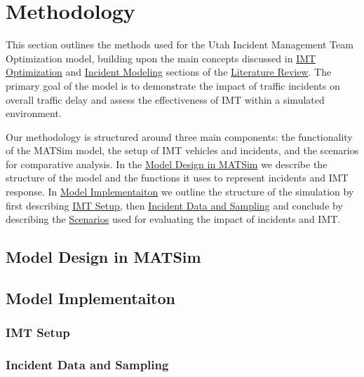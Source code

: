 \documentclass[fancy, oneside, mastersfancy, ms]{byuthesis}
\begin{document}

\hypertarget{sec-methods}{%
\chapter{Methodology}\label{sec-methods}}

This section outlines the methods used for the Utah Incident Management
Team Optimization model, building upon the main concepts discussed in
\protect\hyperlink{sec-lit_imt_opt}{IMT Optimization} and
\protect\hyperlink{sec-lit_inc_mod}{Incident Modeling} sections of the
\protect\hyperlink{sec-literature}{Literature Review}. The primary goal
of the model is to demonstrate the impact of traffic incidents on
overall traffic delay and assess the effectiveness of IMT within a
simulated environment.

Our methodology is structured around three main components: the
functionality of the MATSim model, the setup of IMT vehicles and
incidents, and the scenarios for comparative analysis. In the
\protect\hyperlink{sec-MATSim_mod}{Model Design in MATSim} we describe
the structure of the model and the functions it uses to represent
incidents and IMT response. In \protect\hyperlink{sec-model_imp}{Model
Implementaiton} we outline the structure of the simulation by first
describing \protect\hyperlink{sec-IMT_setup}{IMT Setup}, then
\protect\hyperlink{sec-inc_data}{Incident Data and Sampling} and
conclude by describing the \protect\hyperlink{sec-scenarios}{Scenarios}
used for evaluating the impact of incidents and IMT.

\hypertarget{sec-MATSim_mod}{%
\section{Model Design in MATSim}\label{sec-MATSim_mod}}

\hypertarget{sec-model_imp}{%
\section{Model Implementaiton}\label{sec-model_imp}}

\hypertarget{sec-IMT_setup}{%
\subsection{IMT Setup}\label{sec-IMT_setup}}

\hypertarget{sec-inc_data}{%
\subsection{Incident Data and Sampling}\label{sec-inc_data}}
\end{document}
